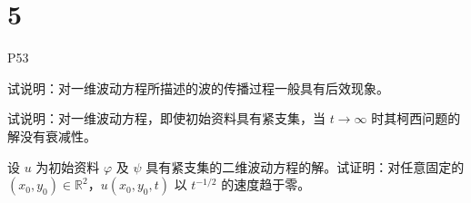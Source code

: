 \section{5}
P53
\begin{homework}[1]
试说明：对一维波动方程所描述的波的传播过程一般具有后效现象。
\end{homework}

\begin{homework}[2]
试说明：对一维波动方程，即使初始资料具有紧支集，当 $t\to\infty$ 时其柯西问题的解没有衰减性。
\end{homework}

\begin{homework}[3]
设 $u$ 为初始资料 $\varphi$ 及 $\psi$ 具有紧支集的二维波动方程的解。试证明：对任意固定的 $(x_0,y_0)\in\mathbb{R}^2$，$u(x_0,y_0,t)$ 以 $t^{-1/2}$ 的速度趋于零。
\end{homework}

